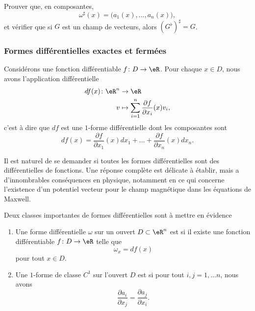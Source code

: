 \begin{exercice}
	Prouver que, en composantes, 
	\begin{equation}
		\omega^{\sharp}(x)=\big( a_1(x),\ldots,a_n(x) \big),
	\end{equation}
	et vérifier que si $G$ est un champ de vecteurs, alors $(G^{\flat})^{\sharp}=G$.
\end{exercice}

\subsubsection{Formes différentielles exactes et fermées}

Considérons une fonction différentiable $f\colon D\to \eR$. Pour chaque $x\in D$, nous avons l'application différentielle
\begin{equation}
	\begin{aligned}
		df(x)\colon \eR^n&\to \eR \\
		v&\mapsto \sum_{i=1}^n\frac{ \partial f }{ \partial x_i }(x)v_i, 
	\end{aligned}
\end{equation}
c'est à dire que $df$ est une $1$-forme différentielle dont les composantes sont
\begin{equation}
	df(x)=\frac{ \partial f }{ \partial x_1 }(x)dx_1+\ldots+\frac{ \partial f }{ \partial x_n }(x)dx_n.
\end{equation}

Il est naturel de se demander si toutes les formes différentielles sont des différentielles de fonctions. Une réponse complète est délicate à établir, mais a d'innombrables conséquences en physique, notamment en ce qui concerne l'existence d'un potentiel vecteur pour le champ magnétique dans les équations de Maxwell.
\begin{definition}
	Deux classes importantes de formes différentielles sont à mettre en évidence
	\begin{enumerate}
		\item
			Une forme différentielle $\omega$ sur un ouvert $D\subset\eR^n$ est  si il existe une fonction différentiable $f\colon D\to \eR$ telle que
			\begin{equation}
				 \omega_x=df(x)
			\end{equation}
			pour tout $x\in D$.
		\item
			Une $1$-forme de classe $C^1$ sur l'ouvert $D$ est  si pour tout $i,j=1,\ldots n$, nous avons
			\begin{equation}
				\frac{ \partial a_i }{ \partial x_j }=\frac{ \partial a_j }{ \partial x_i }.
			\end{equation}
	\end{enumerate}
\end{definition}

